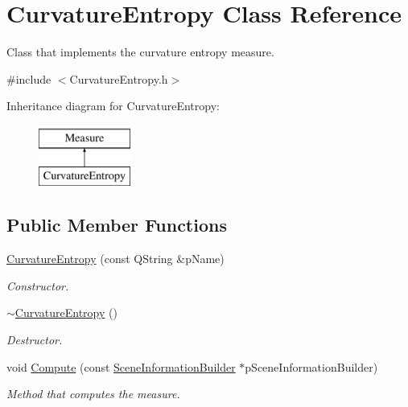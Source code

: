 \hypertarget{class_curvature_entropy}{\section{Curvature\+Entropy Class Reference}
\label{class_curvature_entropy}
}


Class that implements the curvature entropy measure.  




{\ttfamily \#include $<$Curvature\+Entropy.\+h$>$}

Inheritance diagram for Curvature\+Entropy\+:\begin{figure}[H]
\begin{center}
\leavevmode
\includegraphics[height=2.000000cm]{class_curvature_entropy}
\end{center}
\end{figure}
\subsection*{Public Member Functions}
\begin{DoxyCompactItemize}
\item 
\hyperlink{class_curvature_entropy_a5a8adf6e344560ce0fd087b27ff7c689}{Curvature\+Entropy} (const Q\+String \&p\+Name)
\begin{DoxyCompactList}\small\item\em Constructor. \end{DoxyCompactList}\item 
\hyperlink{class_curvature_entropy_a54ffb05970113efbf747fd1d9f6b61a3}{$\sim$\+Curvature\+Entropy} ()
\begin{DoxyCompactList}\small\item\em Destructor. \end{DoxyCompactList}\item 
void \hyperlink{class_curvature_entropy_a45bedcc5b91d7a445edae0cee9d75902}{Compute} (const \hyperlink{class_scene_information_builder}{Scene\+Information\+Builder} $\ast$p\+Scene\+Information\+Builder)
\begin{DoxyCompactList}\small\item\em Method that computes the measure. \end{DoxyCompactList}\end{DoxyCompactItemize}
